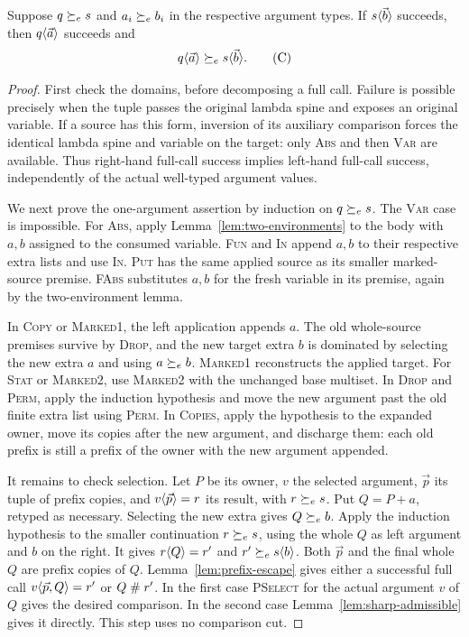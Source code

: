 \begin{lemma}\label{lem:application-covariance}
Suppose $q\succeq_e s$ and $a_i\succeq_e b_i$ in the respective
argument types. If $s\langle \vec b\rangle$ succeeds, then
$q\langle \vec a\rangle$ succeeds and
\[
 q\langle \vec a\rangle\succeq_e s\langle \vec b\rangle.
 \tag{C}
\]
\end{lemma}
\begin{proof}
First check the domains, before decomposing a full call.
Failure is possible precisely when the tuple passes
the original lambda spine and exposes an original
variable. If a source has this form, inversion of its
auxiliary comparison forces the identical lambda
spine and variable on the target: only \textsc{Abs}
and then \textsc{Var} are available. Thus right-hand
full-call success implies left-hand full-call success,
independently of the actual well-typed argument values.

We next prove the one-argument assertion by induction
on $q\succeq_e s$. The \textsc{Var} case is impossible.
For \textsc{Abs}, apply
Lemma~\ref{lem:two-environments} to the body with
$a,b$ assigned to the consumed variable.
\textsc{Fun} and \textsc{In} append $a,b$ to their
respective extra lists and use \textsc{In}.
\textsc{Put} has the same applied source as its
smaller marked-source premise.
\textsc{FAbs} substitutes $a,b$ for the fresh
variable in its premise, again by the two-environment
lemma.

In \textsc{Copy} or \textsc{Marked1}, the left
application appends $a$. The old whole-source
premises survive by \textsc{Drop}, and the new
target extra $b$ is dominated by selecting the new
extra $a$ and using $a\succeq_e b$. \textsc{Marked1}
reconstructs the applied target. For \textsc{Stat}
or \textsc{Marked2}, use \textsc{Marked2} with
the unchanged base multiset. In \textsc{Drop}
and \textsc{Perm}, apply the induction hypothesis
and move the new argument past the old finite extra
list using \textsc{Perm}. In \textsc{Copies}, apply
the hypothesis to the expanded owner, move its
copies after the new argument, and discharge them:
each old prefix is still a prefix of the owner
with the new argument appended.

It remains to check selection. Let $P$ be its owner,
$v$ the selected argument, $\vec p$ its tuple of
prefix copies, and
$v\langle \vec p\rangle=r$ its result, with $r\succeq_e s$.
Put $Q=P+a$, retyped as necessary. Selecting the
new extra gives $Q\succeq_e b$. Apply the induction
hypothesis to the smaller continuation $r\succeq_e s$,
using the whole $Q$ as left argument and $b$ on
the right. It gives
$r\langle Q\rangle=r'$ and $r'\succeq_e s\langle b\rangle$.
Both $\vec p$ and the final whole $Q$ are prefix
copies of $Q$. Lemma~\ref{lem:prefix-escape} gives
either a successful full call $v\langle \vec p,Q\rangle=r'$
or $Q\mathrel{\#} r'$.
In the first case \textsc{PSelect} for the actual
argument $v$ of $Q$ gives the desired comparison.
In the second case
Lemma~\ref{lem:sharp-admissible} gives it directly.
This step uses no comparison cut.


\end{proof}

